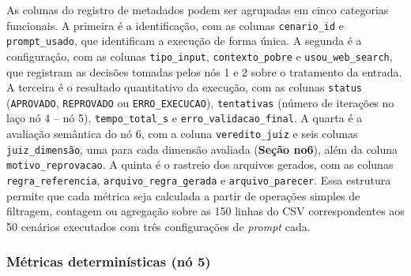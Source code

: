 As colunas do registro de metadados podem ser agrupadas em cinco categorias funcionais. 
A primeira é a identificação, com as colunas \texttt{cenario\_id} e \texttt{prompt\_usado}, que identificam a execução de forma única. 
A segunda é a configuração, com as colunas \texttt{tipo\_input}, \texttt{contexto\_pobre} e \texttt{usou\_web\_search}, que registram as decisões tomadas pelos nós 1 e 2 sobre o tratamento da entrada. 
A terceira é o resultado quantitativo da execução, com as colunas \texttt{status} (\texttt{APROVADO}, \texttt{REPROVADO} ou \texttt{ERRO\_EXECUCAO}), \texttt{tentativas} (número de iterações no laço nó 4 -- nó 5), \texttt{tempo\_total\_s} e \texttt{erro\_validacao\_final}. 
A quarta é a avaliação semântica do nó 6, com a coluna \texttt{veredito\_juiz} e seis colunas \texttt{juiz\_\<dimensão\>}, uma para cada dimensão avaliada (\textbf{Seção no6}), além da coluna \texttt{motivo\_reprovacao}. 
A quinta é o rastreio dos arquivos gerados, com as colunas \texttt{regra\_referencia}, \texttt{arquivo\_regra\_gerada} e \texttt{arquivo\_parecer}. 
Essa estrutura permite que cada métrica seja calculada a partir de operações simples de filtragem, contagem ou agregação sobre as 150 linhas do CSV correspondentes aos 50 cenários executados com três configurações de \textit{prompt} cada.


\subsubsection{Métricas determinísticas (nó 5)}

